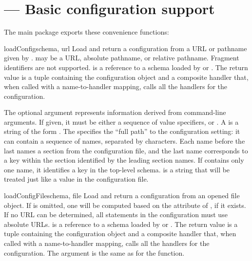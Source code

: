 \documentclass{howto}
\begin{document}
\section{ --- Basic configuration support}


The main  package exports these convenience functions:

\begin{funcdesc}{loadConfig}{schema, url}
  Load and return a configuration from a URL or pathname given by
  .   may be a URL, absolute pathname, or relative
  pathname.  Fragment identifiers are not supported.   is
  a reference to a schema loaded by  or
  .
  The return value is a tuple containing the configuration object and
  a composite handler that, when called with a name-to-handler
  mapping, calls all the handlers for the configuration.

  The optional  argument represents information derived
  from command-line arguments.  If given, it must be either a sequence
  of value specifiers, or .  A  is a
  string of the form .  The
   specifies the ``full path'' to the configuration
  setting: it can contain a sequence of names, separated by
  \character{/} characters. Each name before the last names a section
  from the configuration file, and the last name corresponds to a key
  within the section identified by the leading section names.  If
   contains only one name, it identifies a key in the
  top-level schema.   is a string that will be treated
  just like a value in the configuration file.
\end{funcdesc}

\begin{funcdesc}{loadConfigFile}{schema, file}
  Load and return a configuration from an opened file object.  If
   is omitted, one will be computed based on the
   attribute of , if it exists.  If no URL can
  be determined, all  statements in the
  configuration must use absolute URLs.   is a reference
  to a schema loaded by  or
  .
  The return value is a tuple containing the configuration object and
  a composite handler that, when called with a name-to-handler
  mapping, calls all the handlers for the configuration.
  The  argument is the same as for the
   function.
\end{funcdesc}
\end{document}
